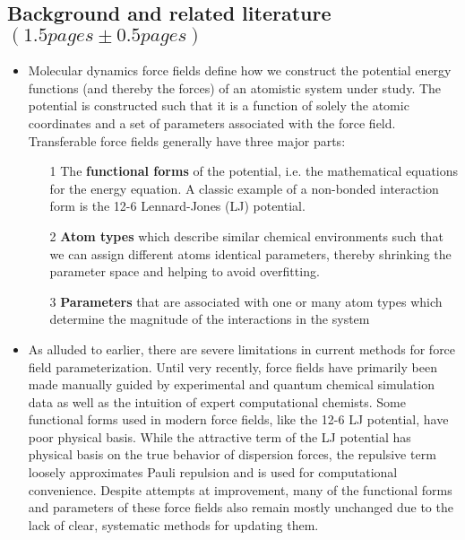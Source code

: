\documentclass[aps,pre,onecolumn,nofootinbib,superscriptaddress,linenumbers,12pt,draft,tightenlines,notitlepage]{revtex4-1}
\begin{document}
\subsection{Background and related literature $\left(1.5 pages \pm 0.5 pages\right)$}
\begin{itemize}
 \item Molecular dynamics force fields define how we construct the potential energy functions (and thereby the forces) of an atomistic system under study. The potential is constructed such that it is a function of solely the atomic coordinates and a set of parameters associated with the force field. Transferable force fields generally have three major parts: 
  \begin{itemize}
   \item [1] The \textbf{functional forms} of the potential, i.e. the mathematical equations for the energy equation. A classic example of a non-bonded interaction form is the 12-6 Lennard-Jones (LJ) potential.  
   \item [2] \textbf{Atom types} which describe similar chemical environments such that we can assign different atoms identical parameters, thereby shrinking the parameter space and helping to avoid overfitting.
   \item [3] \textbf{Parameters} that are associated with one or many atom types which determine the magnitude of the interactions in the system 
  \end{itemize}
 \item As alluded to earlier, there are severe limitations in current methods for force field parameterization. Until very recently, force fields have primarily been made manually guided by experimental and quantum chemical simulation data as well as the intuition of expert computational chemists.\cite{charmm1,charmm2,mm2,mmff,amber} Some functional forms used in modern force fields, like the 12-6 LJ potential, have poor physical basis. While the attractive term of the LJ potential has physical basis on the true behavior of dispersion forces, the repulsive term loosely approximates Pauli repulsion and is used for computational convenience. Despite attempts at improvement, many of the functional forms and parameters of these force fields also remain mostly unchanged due to the lack of clear, systematic methods for updating them.\cite{unchanged} 

\end{itemize}
\end{document}

